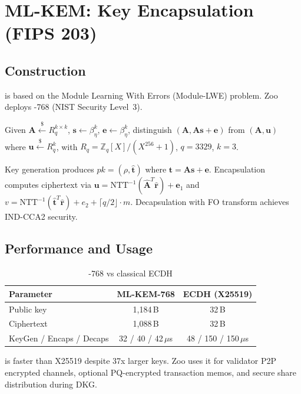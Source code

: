 \section{ML-KEM: Key Encapsulation (FIPS 203)}


\subsection{Construction}

\MLKEM{} is based on the Module Learning With Errors (Module-LWE) problem. Zoo deploys \MLKEM{}-768 (NIST Security Level~3).

\begin{definition}
Given $\mathbf{A} \xleftarrow{\$} R_q^{k \times k}$, $\mathbf{s} \leftarrow \beta_\eta^k$, $\mathbf{e} \leftarrow \beta_\eta^k$, distinguish $(\mathbf{A}, \mathbf{A}\mathbf{s} + \mathbf{e})$ from $(\mathbf{A}, \mathbf{u})$ where $\mathbf{u} \xleftarrow{\$} R_q^k$, with $R_q = \mathbb{Z}_q[X]/(X^{256} + 1)$, $q = 3329$, $k = 3$.
\end{definition}

Key generation produces $pk = (\rho, \hat{\mathbf{t}})$ where $\mathbf{t} = \mathbf{A}\mathbf{s} + \mathbf{e}$. Encapsulation computes ciphertext via $\mathbf{u} = \text{NTT}^{-1}(\hat{\mathbf{A}}^T \hat{\mathbf{r}}) + \mathbf{e}_1$ and $v = \text{NTT}^{-1}(\hat{\mathbf{t}}^T \hat{\mathbf{r}}) + e_2 + \lceil q/2 \rfloor \cdot m$. Decapsulation with FO transform achieves IND-CCA2 security.

\subsection{Performance and Usage}

\begin{table}[h]
\centering
\begin{tabular}{lcc}
\toprule
\textbf{Parameter} & \textbf{ML-KEM-768} & \textbf{ECDH (X25519)} \\
\midrule
Public key & 1,184\,B & 32\,B \\
Ciphertext & 1,088\,B & 32\,B \\
KeyGen / Encaps / Decaps & 32 / 40 / 42\,$\mu$s & 48 / 150 / 150\,$\mu$s \\
\bottomrule
\end{tabular}
\caption{\MLKEM{}-768 vs classical ECDH}
\label{tab:mlkem-perf}
\end{table}

\MLKEM{} is faster than X25519 despite 37x larger keys. Zoo uses it for validator P2P encrypted channels, optional PQ-encrypted transaction memos, and secure share distribution during \Corona{} DKG.


